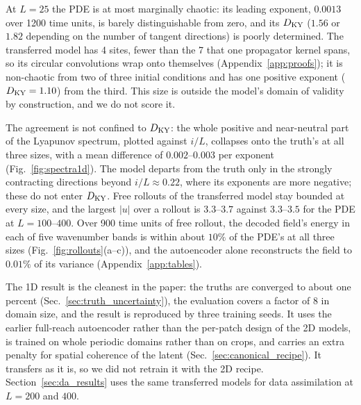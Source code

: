  At $L=25$ the PDE is at most marginally
chaotic: its leading exponent, $0.0013$ over 1200 time units, is barely
distinguishable from zero, and its $D_{\mathrm{KY}}$ ($1.56$ or $1.82$ depending on
the number of tangent directions) is poorly determined. The transferred
model has 4 sites, fewer than the 7 that one propagator kernel spans, so
its circular convolutions wrap onto themselves
(Appendix~\ref{app:proofs}); it is non-chaotic from two of three initial
conditions and has one positive exponent ($D_{\mathrm{KY}}=1.10$) from the third.
This size is outside the model's domain of validity by construction, and
we do not score it.

 The agreement is not confined to $D_{\mathrm{KY}}$:
the whole positive and near-neutral part of the Lyapunov spectrum,
plotted against $i/L$, collapses onto the truth's at all three sizes,
with a mean difference of $0.002$--$0.003$ per exponent
(Fig.~\ref{fig:spectra1d}). The model departs from the truth only in the
strongly contracting directions beyond $i/L\approx0.22$, where its
exponents are more negative; these do not enter $D_{\mathrm{KY}}$. Free rollouts of
the transferred model stay bounded at every size, and the largest $|u|$
over a rollout is $3.3$--$3.7$ against $3.3$--$3.5$ for the PDE
at $L=100$--$400$. Over 900 time units of free rollout, the decoded
field's energy in each of five wavenumber bands is within about $10\%$ of
the PDE's at all three sizes (Fig.~\ref{fig:rollouts}(a--c)), and the
autoencoder alone reconstructs the field to $0.01\%$ of its variance
(Appendix~\ref{app:tables}).

 The 1D result is the cleanest
in the paper: the truths are converged to about one percent
(Sec.~\ref{sec:truth_uncertainty}), the evaluation covers a factor of 8
in domain size, and the result is reproduced by three training seeds.
It uses the earlier full-reach autoencoder rather than the per-patch
design of the 2D models, is trained on whole periodic domains rather
than on crops, and carries an extra penalty for spatial coherence of the
latent (Sec.~\ref{sec:canonical_recipe}). It transfers as it is, so we
did not retrain it with the 2D recipe. Section~\ref{sec:da_results} uses the same
transferred models for data assimilation at $L=200$ and $400$.
